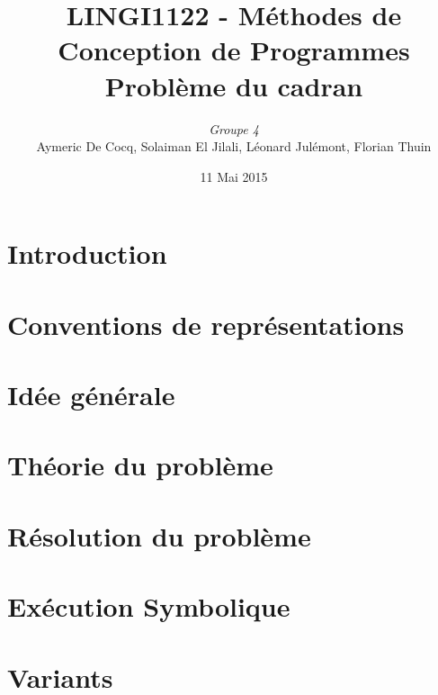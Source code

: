 \documentclass[11pt,a4paper]{article}
\author{\textit{Groupe 4}\\
Aymeric De Cocq, Solaiman El Jilali, Léonard Julémont, Florian Thuin}
\title{LINGI1122 - Méthodes de Conception de Programmes\\
Problème du cadran}
\date{11 Mai 2015}
\begin{document}
\maketitle

\section* {Introduction}


\section{Conventions de représentations}

\section{Idée générale}



\section{Théorie du problème}




\section{Résolution du problème}





\section{Exécution Symbolique}

\section{Variants}
\end{document}
